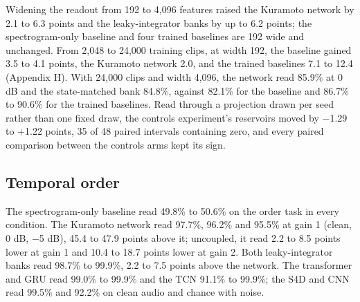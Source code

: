 \documentclass[10pt]{article}
\begin{document}
Widening the readout from 192 to 4,096 features raised the Kuramoto
network by 2.1 to 6.3 points and the leaky-integrator banks by up to 6.2
points; the spectrogram-only baseline and four trained baselines are 192
wide and unchanged. From 2,048 to 24,000 training clips, at width 192,
the baseline gained 3.5 to 4.1 points, the Kuramoto network 2.0, and the
trained baselines 7.1 to 12.4 (Appendix H). With 24,000 clips and width
4,096, the network read 85.9\% at 0 dB and the state-matched bank
84.8\%, against 82.1\% for the baseline and 86.7\% to 90.6\% for the
trained baselines. Read through a projection drawn per seed rather than
one fixed draw, the controls experiment's reservoirs moved by
\ensuremath{-}1.29 to +1.22 points, 35 of 48 paired intervals containing
zero, and every paired comparison between the controls arms kept its
sign.

\subsection{Temporal order}\label{temporal-order}

The spectrogram-only baseline read 49.8\% to 50.6\% on the order task in
every condition. The Kuramoto network read 97.7\%, 96.2\% and 95.5\% at
gain 1 (clean, 0 dB, \ensuremath{-}5 dB), 45.4 to 47.9 points above it;
uncoupled, it read 2.2 to 8.5 points lower at gain 1 and 10.4 to 18.7
points lower at gain 2. Both leaky-integrator banks read 98.7\% to
99.9\%, 2.2 to 7.5 points above the network. The transformer and GRU
read 99.0\% to 99.9\% and the TCN 91.1\% to 99.9\%; the S4D and CNN read
99.5\% and 92.2\% on clean audio and chance with noise.
\end{document}

